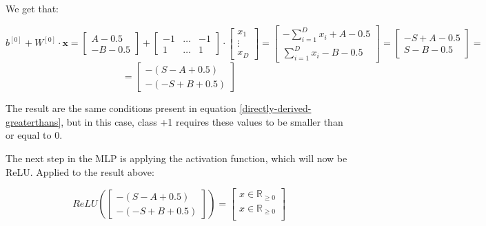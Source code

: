 \documentclass[12pt]{article}
\begin{document}
\begin{itemize}
        We get that:

        \[
            b^{[0]} + W^{[0]} \cdot \textbf{x} =
            \begin{bmatrix}
                A-0.5 \\
                -B-0.5
            \end{bmatrix}
            +
            \begin{bmatrix}
                -1 & \hdots & -1 \\
                1 & \hdots & 1
            \end{bmatrix}
            \cdot
            \begin{bmatrix}
                x_1 \\
                \vdots \\
                x_D
            \end{bmatrix}
            =
            \begin{bmatrix}
                -\sum_{i=1}^{D} x_i  + A - 0.5 \\
                \sum_{i=1}^{D} x_i - B - 0.5
            \end{bmatrix}
            =
            \begin{bmatrix}
                - S + A - 0.5\\
                S -B - 0.5
            \end{bmatrix}
            =
        \]
        \begin{equation}
        =
            \begin{bmatrix}
                - (S - A + 0.5)\\
                - (-S + B + 0.5)
                \end{bmatrix}
                \label{z1-relu}
        \end{equation}

        The result are the same conditions present in equation \ref{directly-derived-greaterthans}, but in this case, class +1 requires these values to be smaller than or equal to 0.

        The next step in the MLP is applying the activation function, which will now be ReLU. Applied to the result above:

        \[
            ReLU(
            \begin{bmatrix}
                - (S - A + 0.5)\\
                - (-S + B + 0.5)
            \end{bmatrix}
            ) =
            \begin{bmatrix}
                x \in \mathbb{R}_{\geq 0} \\
                x \in \mathbb{R}_{\geq 0} \\
            \end{bmatrix}
        \]


\end{itemize}
\end{document}
